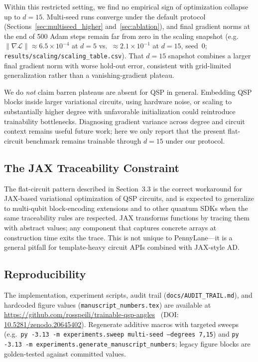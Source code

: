 \documentclass[11pt,a4paper]{article}
\begin{document}
Within this restricted setting, we find no empirical sign of optimization collapse up to $d=15$. Multi-seed runs converge under the default protocol (Sections~\ref{sec:multiseed_higher} and~\ref{sec:ablation}), and final gradient norms at the end of 500 Adam steps remain far from zero in the scaling snapshot (e.g.\ $\|\nabla\mathcal{L}\|\approx6.5\times10^{-4}$ at $d=5$ vs.\ $\approx2.1\times10^{-1}$ at $d=15$, seed~0; \texttt{results/scaling/scaling\_table.csv}). That $d=15$ snapshot combines a larger final gradient norm with worse hold-out error, consistent with grid-limited generalization rather than a vanishing-gradient plateau.

We do \emph{not} claim barren plateaus are absent for QSP in general. Embedding QSP blocks inside larger variational circuits, using hardware noise, or scaling to substantially higher degree with unfavorable initialization could reintroduce trainability bottlenecks. Diagnosing gradient variance across degree and circuit context remains useful future work; here we only report that the present flat-circuit benchmark remains trainable through $d=15$ under our protocol.

\subsection{The JAX Traceability Constraint}

The flat-circuit pattern described in Section~3.3 is the correct workaround for JAX-based variational optimization of QSP circuits, and is expected to generalize to multi-qubit block-encoding extensions and to other quantum SDKs when the same traceability rules are respected. JAX transforms functions by tracing them with abstract values; any component that captures concrete arrays at construction time exits the trace. This is not unique to PennyLane---it is a general pitfall for template-heavy circuit APIs combined with JAX-style AD.

\subsection{Reproducibility}

The implementation, experiment scripts, audit trail (\texttt{docs/AUDIT\_TRAIL.md}), and hardcoded figure values (\texttt{manuscript\_numbers.tex}) are available at \url{https://github.com/rosspeili/trainable-qsp-angles}~\cite{peili_trainable_qsp_2026} (DOI: \href{https://doi.org/10.5281/zenodo.20645402}{10.5281/zenodo.20645402}). Regenerate additive macros with targeted sweeps (e.g.\ \texttt{py -3.13 -m experiments.sweep multi-seed --degrees 7,15}) and \texttt{py -3.13 -m experiments.generate\_manuscript\_numbers}; legacy figure blocks are golden-tested against committed values.
\end{document}
